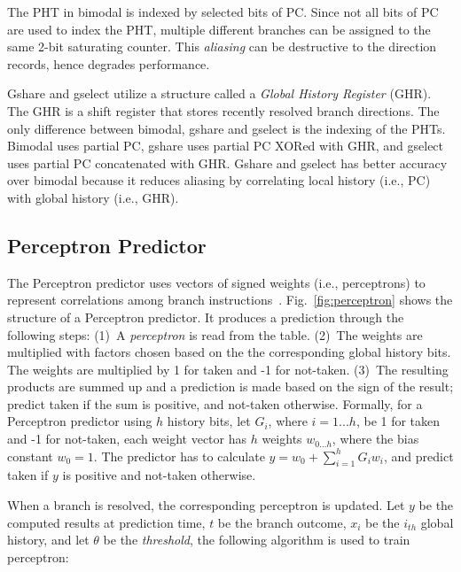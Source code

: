 The PHT in bimodal is indexed by selected bits of PC. Since not all bits of PC are used to index the PHT, multiple different branches can be assigned to the same 2-bit saturating counter. This \textit{aliasing} can be destructive to the direction records, hence degrades performance.

Gshare and gselect utilize a structure called a \textit{Global History Register} (GHR). The GHR is a shift register that stores recently resolved branch directions. The only difference between bimodal, gshare and gselect is the indexing of the PHTs. Bimodal uses partial PC, gshare uses partial PC XORed with GHR, and gselect uses partial PC concatenated with GHR. Gshare and gselect has better accuracy over bimodal because it reduces aliasing by correlating local history (i.e., PC) with global history (i.e., GHR).


\subsection{Perceptron Predictor}
\label{sec:background:dirpred:perceptron}
The Perceptron predictor uses vectors of signed weights (i.e., perceptrons) to represent correlations among branch instructions~\cite{perceptron}. Fig.~\ref{fig:perceptron} shows the structure of a Perceptron predictor. It produces a prediction through the following steps: (1)~A \textit{perceptron} is read from the table. (2)~The weights are multiplied with factors chosen based on the the corresponding global history bits. The weights are multiplied by 1 for taken and -1 for not-taken. (3)~The resulting products are summed up and a prediction is made based on the sign of the result; predict taken if the sum is positive, and not-taken otherwise. Formally, for a Perceptron predictor using $h$ history bits, let $G_i$, where $i = 1...h$, be 1 for taken and -1 for not-taken, each weight vector has $h$ weights $w_{0...h}$, where the bias constant $w_0 = 1$. The predictor has to calculate $y = w_0 + \sum_{i=1}^{h} G_iw_i$, and predict taken if $y$ is positive and not-taken otherwise.

When a branch is resolved, the corresponding perceptron is updated. Let $y$ be the computed results at prediction time, $t$ be the branch outcome, $x_i$ be the $i_{th}$ global history, and let $\theta$ be the \textit{threshold}, the following algorithm is used to train perceptron:\vspace{8 mm}

